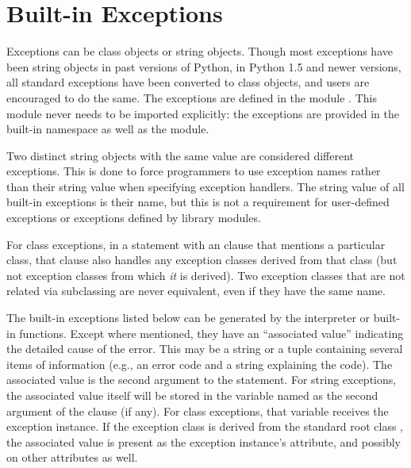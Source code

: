 \section{Built-in Exceptions}



Exceptions can be class objects or string objects.  Though most
exceptions have been string objects in past versions of Python, in
Python 1.5 and newer versions, all standard exceptions have been
converted to class objects, and users are encouraged to do the same.
The exceptions are defined in the module .  This
module never needs to be imported explicitly: the exceptions are
provided in the built-in namespace as well as the 
module.

Two distinct string objects with the same value are considered different
exceptions.  This is done to force programmers to use exception names
rather than their string value when specifying exception handlers.
The string value of all built-in exceptions is their name, but this is
not a requirement for user-defined exceptions or exceptions defined by
library modules.

For class exceptions, in a  statement with
an  clause that mentions a particular
class, that clause also handles any exception classes derived from
that class (but not exception classes from which \emph{it} is
derived).  Two exception classes that are not related via subclassing
are never equivalent, even if they have the same name.

The built-in exceptions listed below can be generated by the
interpreter or built-in functions.  Except where mentioned, they have
an ``associated value'' indicating the detailed cause of the error.
This may be a string or a tuple containing several items of
information (e.g., an error code and a string explaining the code).
The associated value is the second argument to the
 statement.  For string exceptions, the
associated value itself will be stored in the variable named as the
second argument of the  clause (if any).  For class
exceptions, that variable receives the exception instance.  If the
exception class is derived from the standard root class
, the associated value is present as the
exception instance's  attribute, and possibly on other
attributes as well.

